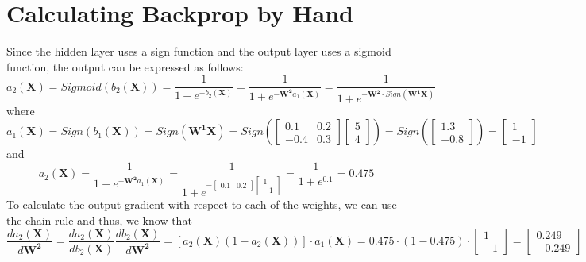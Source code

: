 \documentclass{article}
\begin{document}
    \section{Calculating Backprop by Hand}
    	Since the hidden layer uses a sign function and the output layer uses a sigmoid function, the output can be expressed as follows:
    	$$a_2(\boldsymbol{X})=
    	Sigmoid(b_2(\boldsymbol{X}))=
    	\dfrac{1}{1+e^{-b_2(\boldsymbol{X})}}=
    	\dfrac{1}{1+e^{-\boldsymbol{W^2}a_1(\boldsymbol{X})}}=
    	\dfrac{1}{1+e^{-\boldsymbol{W^2}\cdot Sign(\boldsymbol{W^1}\boldsymbol{X})}}$$
    	where
    	$$a_1(\boldsymbol{X})=
    	Sign(b_1(\boldsymbol{X}))=
    	Sign(\boldsymbol{W^1}\boldsymbol{X})=
    	Sign(\begin{bmatrix}0.1 & 0.2\\-0.4 & 0.3\end{bmatrix} \begin{bmatrix}5\\4\end{bmatrix})=
    	Sign(\begin{bmatrix}1.3\\-0.8\end{bmatrix})=
    	\begin{bmatrix}1\\-1\end{bmatrix}$$
    	and
    	$$a_2(\boldsymbol{X})=
    	\dfrac{1}{1+e^{-\boldsymbol{W^2}a_1(\boldsymbol{X})}}=
    	\dfrac{1}{1+e^{-\begin{bmatrix}0.1&0.2\end{bmatrix}\begin{bmatrix}1\\-1\end{bmatrix}}}=
    	\dfrac{1}{1+e^{0.1}}=0.475$$
    	To calculate the output gradient with respect to each of the weights, we can use the chain rule and thus, we know that
    	$$\dfrac{da_2(\boldsymbol{X})}{d\boldsymbol{W^2}}=
    	\dfrac{da_2(\boldsymbol{X})}{db_2(\boldsymbol{X})}\dfrac{db_2(\boldsymbol{X})}{d\boldsymbol{W^2}}=
    	[a_2(\boldsymbol{X})(1-a_2(\boldsymbol{X}))]\cdot a_1(\boldsymbol{X})=0.475\cdot(1-0.475)\cdot\begin{bmatrix}1\\-1\end{bmatrix}=\begin{bmatrix}0.249\\-0.249\end{bmatrix}$$
\end{document}
